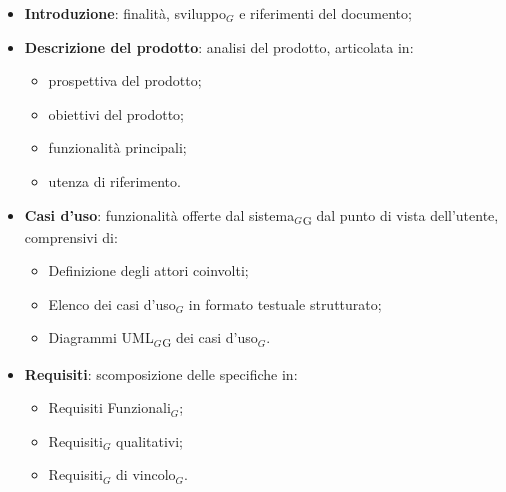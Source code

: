 \documentclass[a4paper, 10pt]{article}
\begin{document}
\begin{itemize}
    \item \textbf{Introduzione}: finalità, sviluppo$_G$ e riferimenti del documento;
    \item \textbf{Descrizione del prodotto}: analisi del prodotto, articolata in:
    \begin{itemize}
        \item prospettiva del prodotto;
        \item obiettivi del prodotto;
        \item funzionalità principali;
        \item utenza di riferimento.
    \end{itemize}
    \item \textbf{Casi d'uso}: funzionalità offerte dal sistema$_G$\textsubscript{G} dal punto di vista dell'utente, comprensivi di:
    \begin{itemize}
        \item Definizione degli attori coinvolti;
        \item Elenco dei casi d'uso$_G$ in formato testuale strutturato;
        \item Diagrammi UML$_G$\textsubscript{G} dei casi d'uso$_G$.
    \end{itemize}
    \item \textbf{Requisiti}: scomposizione delle specifiche in:
    \begin{itemize}
        \item Requisiti Funzionali$_G$;
        \item Requisiti$_G$ qualitativi;
        \item Requisiti$_G$ di vincolo$_G$.
    \end{itemize}
\end{itemize}
\end{document}
